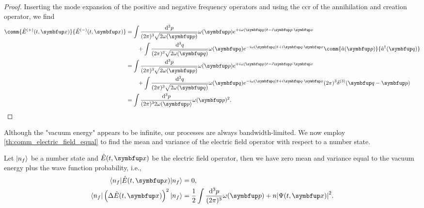\begin{proof}
	Inserting the mode expansion of the positive and negative frequency operators and using the \gls{ccr} of the annihilation and creation operator, we find
	\begin{equation}
		\begin{split}
			\comm{\hat{E}^{(+)}(t,\vb{x})}{\hat{E}^{(-)}(t,\vb{x})}
			&=
			\int\frac{\dd[3]{p}}{(2\pi)^3\sqrt{2\omega(\vb{p})}}
			\omega(\vb{p})
			e^{+i\omega(\vb{p})t-i\vb{p}\vdot\vb{x}}
			\\
			&\qquad+
			\int\frac{\dd[3]{q}}{(2\pi)^3\sqrt{2\omega(\vb{q})}}
			\omega(\vb{q})
			e^{-i\omega(\vb{q})t+i\vb{q}\vdot\vb{x}}
			\comm{\hat{a}(\vb{p})}{\hat{a}^\dagger(\vb{q})}
			\\
			&=
			\int\frac{\dd[3]{p}}{(2\pi)^3\sqrt{2\omega(\vb{p})}}
			\omega(\vb{p})
			e^{+i\omega(\vb{p})t-i\vb{p}\vdot\vb{x}}
			\\
			&\qquad+
			\int\frac{\dd[3]{q}}{(2\pi)^3\sqrt{2\omega(\vb{q})}}
			\omega(\vb{q})
			e^{-i\omega(\vb{q})t+i\vb{q}\vdot\vb{x}}
			(2\pi)^3\delta^{(3)}(\vb{q}-\vb{p})
			\\
			&=
			\int\frac{\dd[3]{p}}{(2\pi)^32\omega(\vb{p})}
			\omega(\vb{p})^2
			.
		\end{split}
	\end{equation}
\end{proof}
Although the "vacuum energy" appears to be infinite, our processes are always bandwidth-limited.
We now employ \cref{th:comm_electric_field_equal} to find the mean and variance of the electric field operator with respect to a number state.
\begin{theorem}
	Let $\lvert n_f\rangle$ be a number state and $\hat{E}(t,\vb{x})$ be the electric field operator, then we have zero mean and variance equal to the vacuum energy plus the wave function probability, i.e.,
	\begin{align}
		\bra{n_f}
		\hat{E}(t,\vb{x})
		\ket{n_f}
		&=
		0
		,
		\\
		\bra{n_f}
		\left(
			\Delta
			\hat{E}(t,\vb{x})
		\right)^2
		\ket{n_f}
		&=
		\frac{1}{2}
		\int\frac{\dd[3]{p}}{(2\pi)^3}
		\omega(\vb{p})
		+
		n
		\abs*{\Psi(t,\vb{x})}^2
		.
	\end{align}
\end{theorem}
